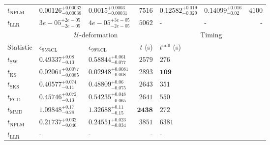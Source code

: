 \begin{tabular}{l|llr|llr}
\rowcolor{red!35}	$t_{\mathrm{NPLM}}$ & $0.00126_{-0.00038}^{+0.00032}$ & $0.0015_{-0.00031}^{+0.0003}$ & $7516$ & $0.12582_{-0.029}^{+0.019}$ & $0.14099_{-0.02}^{+0.016}$ & $4100$ \\
	$t_{\mathrm{LLR}}$ & $3e-05_{-2e-05}^{+2e-05}$ & $4e-05_{-2e-05}^{+3e-05}$ & $5062$ & - & - & - \\
	\toprule
	\multicolumn{1}{c}{} & \multicolumn{3}{c}{$\mathcal{U}$-deformation} & \multicolumn{3}{c}{Timing} \\
	Statistic & $\epsilon_{95\%\mathrm{CL}}$ & $\epsilon_{99\%\mathrm{CL}}$ & $t$ (s) & $t^{\mathrm{null}}$ (s) \\
	\midrule
	$t_{\mathrm{SW}}$ & $0.49337_{-0.13}^{+0.08}$ & $0.58844_{-0.077}^{+0.061}$ & $2579$ & $276$ \\
	$t_{\overline{\mathrm{KS}}}$ & ${\mathbf{0.02061_{-0.0085}^{+0.0077}}}$ & ${\mathbf{0.02948_{-0.008}^{+0.0081}}}$ & $2893$ & ${\mathbf{109}}$ \\
	$t_{\mathrm{SKS}}$ & $0.40577_{-0.11}^{+0.074}$ & $0.48809_{-0.075}^{+0.06}$ & $2643$ & $351$ \\
	$t_{\mathrm{FGD}}$ & $0.45746_{-0.13}^{+0.072}$ & $0.54235_{-0.065}^{+0.048}$ & $2641$ & $550$ \\
	$t_{\mathrm{MMD}}$ & $1.09848_{-0.28}^{+0.17}$ & $1.32688_{-0.15}^{+0.11}$ & ${\mathbf{2438}}$ & $272$ \\
\rowcolor{red!35}	$t_{\mathrm{NPLM}}$ & $0.21737_{-0.046}^{+0.032}$ & $0.24551_{-0.034}^{+0.023}$ & $3851$ & $6381$ \\
	$t_{\mathrm{LLR}}$ & - & - & - & - \\
	\bottomrule
\end{tabular}